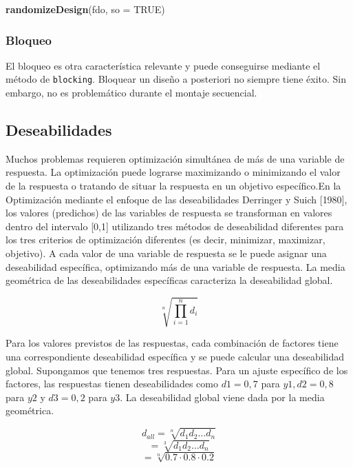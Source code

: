 \documentclass[
]{book}
\newenvironment{Shaded}{\begin{snugshade}}{\end{snugshade}}
\newcommand{\AttributeTok}[1]{\textcolor[rgb]{0.13,0.29,0.53}{#1}}
\newcommand{\ConstantTok}[1]{\textcolor[rgb]{0.56,0.35,0.01}{#1}}
\newcommand{\FunctionTok}[1]{\textcolor[rgb]{0.13,0.29,0.53}{\textbf{#1}}}
\newcommand{\NormalTok}[1]{#1}
\begin{document}
\begin{Shaded}
\begin{Highlighting}[]
\FunctionTok{randomizeDesign}\NormalTok{(fdo, }\AttributeTok{so =} \ConstantTok{TRUE}\NormalTok{)}
\end{Highlighting}
\end{Shaded}

\hypertarget{bloqueo}{%
\subsubsection{Bloqueo}\label{bloqueo}}

El bloqueo es otra característica relevante y puede conseguirse mediante el método de \texttt{blocking}. Bloquear un diseño a posteriori no siempre tiene éxito.
Sin embargo, no es problemático durante el montaje secuencial.

\hypertarget{deseabilidades}{%
\subsection{Deseabilidades}\label{deseabilidades}}

Muchos problemas requieren optimización simultánea de más de una variable de respuesta. La optimización puede lograrse maximizando o minimizando el valor de la respuesta o tratando de situar la respuesta en un objetivo específico.En la Optimización mediante el enfoque de las deseabilidades Derringer y Suich {[}1980{]}, los valores (predichos) de las variables de respuesta se transforman en valores dentro del intervalo {[}0,1{]} utilizando tres métodos de deseabilidad diferentes
para los tres criterios de optimización diferentes (es decir, minimizar, maximizar, objetivo). A cada valor de una variable de respuesta se le puede asignar una deseabilidad específica, optimizando más de una variable de respuesta. La media geométrica de las deseabilidades específicas caracteriza la deseabilidad global.

\[\sqrt[n]{\prod^n_{i=1}d_i}\]

Para los valores previstos de las respuestas, cada combinación de factores tiene una correspondiente deseabilidad específica y se puede calcular una deseabilidad global. Supongamos que tenemos
tres respuestas. Para un ajuste específico de los factores, las respuestas tienen deseabilidades
como \(d1 = 0,7\) para \(y1, d2 = 0,8\) para \(y2\) y \(d3 = 0,2\) para \(y3\). La deseabilidad global
viene dada por la media geométrica.

\[d_{all}=\sqrt[n]{d_1d_2\ldots d_n}\]
\[=\sqrt[3]{d_1d_2\ldots d_n}\]
\[=\sqrt[n]{0.7\cdot0.8\cdot0.2}\]
\end{document}
